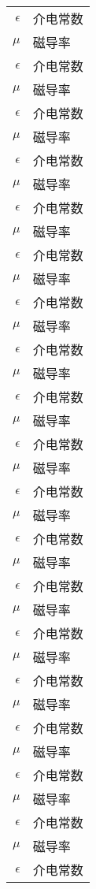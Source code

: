 \begin{nomenclature}

\begin{longtable}{rl}
  $\epsilon$ & 介电常数 \\
  $\mu$      & 磁导率  \\
  $\epsilon$ & 介电常数 \\
  $\mu$      & 磁导率  \\
  $\epsilon$ & 介电常数 \\
  $\mu$      & 磁导率  \\
  $\epsilon$ & 介电常数 \\
  $\mu$      & 磁导率  \\
  $\epsilon$ & 介电常数 \\
  $\mu$      & 磁导率  \\
  $\epsilon$ & 介电常数 \\
  $\mu$      & 磁导率  \\
  $\epsilon$ & 介电常数 \\
  $\mu$      & 磁导率  \\
  $\epsilon$ & 介电常数 \\
  $\mu$      & 磁导率  \\
  $\epsilon$ & 介电常数 \\
  $\mu$      & 磁导率  \\
  $\epsilon$ & 介电常数 \\
  $\mu$      & 磁导率  \\
  $\epsilon$ & 介电常数 \\
  $\mu$      & 磁导率  \\
  $\epsilon$ & 介电常数 \\
  $\mu$      & 磁导率  \\
  $\epsilon$ & 介电常数 \\
  $\mu$      & 磁导率  \\
  $\epsilon$ & 介电常数 \\
  $\mu$      & 磁导率  \\
  $\epsilon$ & 介电常数 \\
  $\mu$      & 磁导率  \\
  $\epsilon$ & 介电常数 \\
  $\mu$      & 磁导率  \\
  $\epsilon$ & 介电常数 \\
  $\mu$      & 磁导率  \\
  $\epsilon$ & 介电常数 \\
  $\mu$      & 磁导率  \\
  $\epsilon$ & 介电常数 \\

\end{longtable}
\end{nomenclature}
